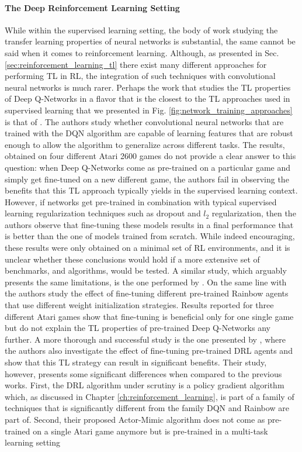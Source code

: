 \paragraph{The Deep Reinforcement Learning Setting}
While within the supervised learning setting, the body of work studying the transfer learning properties of neural networks is substantial, the same cannot be said when it comes to reinforcement learning. Although, as presented in Sec. \ref{sec:reinforcement_learning_tl} there exist many different approaches for performing TL in RL, the integration of such techniques with convolutional neural networks is much rarer. Perhaps the work that studies the TL properties of Deep Q-Networks in a flavor that is the closest to the TL approaches used in supervised learning that we presented in Fig. \ref{fig:network_training_approaches} is that of \citet{farebrother2018generalization}. The authors study whether convolutional neural networks that are trained with the DQN algorithm \cite{mnih2015human} are capable of learning features that are robust enough to allow the algorithm to generalize across different tasks. The results, obtained on four different Atari 2600 games do not provide a clear answer to this question: when Deep Q-Networks come as pre-trained on a particular game and simply get fine-tuned on a new different game, the authors fail in observing the benefits that this TL approach typically yields in the supervised learning context. However, if networks get pre-trained in combination with typical supervised learning regularization techniques such as dropout \cite{srivastava2014dropout} and $l_2$ regularization, then the authors observe that fine-tuning these models results in a final performance that is better than the one of models trained from scratch. While indeed encouraging, these results were only obtained on a minimal set of RL environments, and it is unclear whether these conclusions would hold if a more extensive set of benchmarks, and algorithms, would be tested. A similar study, which arguably presents the same limitations, is the one performed by \citet{tyo2020transferable}. On the same line with \citet{farebrother2018generalization} the authors study the effect of fine-tuning different pre-trained Rainbow agents \cite{hessel2018rainbow} that use different weight initialization strategies. Results reported for three different Atari games show that fine-tuning is beneficial only for one single game but do not explain the TL properties of pre-trained Deep Q-Networks any further. A more thorough and successful study is the one presented by \citet{parisotto2015actor}, where the authors also investigate the effect of fine-tuning pre-trained DRL agents and show that this TL strategy can result in significant benefits. Their study, however, presents some significant differences when compared to the previous works. First, the DRL algorithm under scrutiny is a policy gradient algorithm which, as discussed in Chapter \ref{ch:reinforcement_learning}, is part of a family of techniques that is significantly different from the family DQN and Rainbow are part of. Second, their proposed Actor-Mimic algorithm does not come as pre-trained on a single Atari game anymore but is pre-trained in a multi-task learning setting 